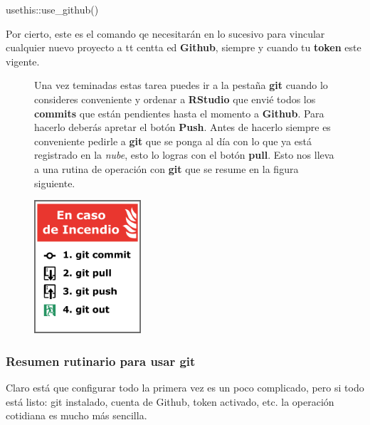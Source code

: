\documentclass[
  letterpaper,
  DIV=11,
  numbers=noendperiod]{scrartcl}
\newenvironment{Shaded}{\begin{snugshade}}{\end{snugshade}}
\newcommand{\FunctionTok}[1]{\textcolor[rgb]{0.28,0.35,0.67}{#1}}
\newcommand{\NormalTok}[1]{\textcolor[rgb]{0.00,0.23,0.31}{#1}}
\newcommand{\SpecialCharTok}[1]{\textcolor[rgb]{0.37,0.37,0.37}{#1}}
\begin{document}
\begin{Shaded}
\begin{Highlighting}[]
\NormalTok{usethis}\SpecialCharTok{::}\FunctionTok{use\_github}\NormalTok{()}
\end{Highlighting}
\end{Shaded}

Por cierto, este es el comando qe necesitarán en lo sucesivo para
vincular cualquier nuevo proyecto a tt centta ed \textbf{Github},
siempre y cuando tu \textbf{token} este vigente.

\begin{figure}

\begin{minipage}{0.67\linewidth}
Una vez teminadas estas tarea puedes ir a la pestaña \textbf{git} cuando
lo consideres conveniente y ordenar a \textbf{RStudio} que envié todos
los \textbf{commits} que están pendientes hasta el momento a
\textbf{Github}. Para hacerlo deberás apretar el botón \textbf{Push}.
Antes de hacerlo siempre es conveniente pedirle a \textbf{git} que se
ponga al día con lo que ya está registrado en la \emph{nube}, esto lo
logras con el botón \textbf{pull}. Esto nos lleva a una rutina de
operación con \textbf{git} que se resume en la figura
siguiente.\end{minipage}%
%
\begin{minipage}{0.33\linewidth}
\includegraphics[width=1.5625in,height=\textheight]{images/En caso de incendio.png}\end{minipage}%

\end{figure}%

\subsubsection{\texorpdfstring{Resumen rutinario para usar
\textbf{git}}{Resumen rutinario para usar git}}\label{resumen-rutinario-para-usar-git}

Claro está que configurar todo la primera vez es un poco complicado,
pero si todo está listo: git instalado, cuenta de Github, token
activado, etc. la operación cotidiana es mucho más sencilla.
\end{document}
